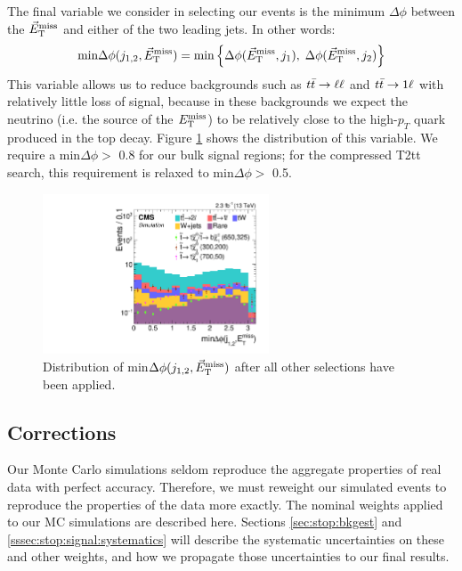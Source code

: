 The final variable we consider in selecting our events is the minimum
$\Delta\phi$ between the $\vec{E}_\text{T}^\text{miss}$ and either of the two leading
jets. In other words:
\begin{equation}
\text{min} \Delta\phi (j_{1,2},\vec{E}_\text{T}^\text{miss}) = \text{min} \left\{ \Delta\phi
    (\vec{E}_\text{T}^\text{miss}, j_1),\; \Delta\phi (\vec{E}_\text{T}^\text{miss}, j_2) \right\}
\end{equation}
This variable allows us to reduce backgrounds such as $t\bar{t} \rightarrow \ell\ell$ and
$t\bar{t} \rightarrow 1\ell$  with relatively little loss of signal, because in these
backgrounds we expect the neutrino (i.e. the source of the $E_\text{T}^\text{miss}$) to
be relatively close to the high-$p_T$ quark produced in the top
decay. Figure \ref{fig:stop:mindphi} shows the distribution of this
variable. We require a min$\Delta\phi >$ 0.8 for our bulk signal
regions; for the compressed T2tt search, this requirement is relaxed
to min$\Delta\phi >$ 0.5.

\begin{figure}
\centering
\includegraphics[width=0.6\textwidth]{figures/nminusone_mindphi.pdf}
\caption{Distribution of min$\Delta\phi (j_{1,2}, \vec{E}_\text{T}^\text{miss})$ after all
  other selections have been applied.}
\label{fig:stop:mindphi}
\end{figure}

\subsection{Corrections}
\label{ssec:stop:corrections}

Our Monte Carlo simulations seldom reproduce the aggregate properties of
real data with perfect accuracy. Therefore, we must reweight our
simulated events to reproduce the properties of the data more
exactly. The nominal weights applied to our MC simulations are
described here. Sections \ref{sec:stop:bkgest} and
\ref{sssec:stop:signal:systematics} will describe the systematic uncertainties
on these and other weights, and how we propagate those uncertainties
to our final results.

